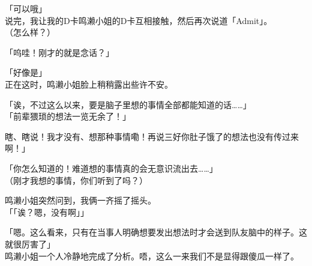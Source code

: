 「可以哦」\\

说完，我让我的D卡鸣濑小姐的D卡互相接触，然后再次说道「Admit」。\\

（怎么样？）

「呜哇！刚才的就是念话？」

「好像是」\\

正在这时，鸣濑小姐脸上稍稍露出些许不安。

「诶，不过这么以来，要是脑子里想的事情全部都能知道的话……」\\

「前辈猥琐的想法一览无余了！」

瞎、瞎说！我才没有、想那种事情嘞！再说三好你肚子饿了的想法也没有传过来啊！」

「你怎么知道的！难道想的事情真的会无意识流出去……」\\

（刚才我想的事情，你们听到了吗？）

鸣濑小姐突然问到，我俩一齐摇了摇头。\\

「「诶？嗯，没有啊」」

「嗯。这么看来，只有在当事人明确想要发出想法时才会送到队友脑中的样子。这就很厉害了」\\

鸣濑小姐一个人冷静地完成了分析。唔，这么一来我们不是显得跟傻瓜一样了。\\

